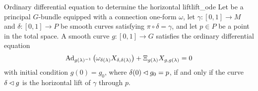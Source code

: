 \begin{theorem}{Ordinary differential equation to determine the horizontal lift}{lift_ode}
    Let  be a principal \(G\)-bundle equipped with a connection one-form \(\omega\), let \(\gamma : [0,1] \to M\) and \(\delta : [0,1] \to P\) be smooth curves satisfying \(\pi \circ \delta = \gamma\), and let \(p \in P\) be a point in the total space. A smooth curve \(g : [0,1] \to G\) satisfies the ordinary differential equation
    \begin{equation*}
        \operatorname{Ad}_{g(\lambda)^{-1}}\left(\omega_{\delta(\lambda)}X_{\delta, \delta(\lambda)}\right) + \Xi_{g(\lambda)}X_{g, g(\lambda)} = 0
    \end{equation*}
    with initial condition \(g(0) = g_0\), where \(\delta(0) \mathbin{\vartriangleleft} g_0 = p\), if and only if the curve \(\delta \mathbin{\vartriangleleft} g\) is the horizontal lift of \(\gamma\) through \(p\).
\end{theorem}
